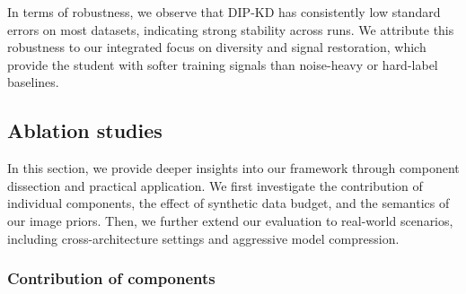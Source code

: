 \begin{foldable}
  In terms of robustness, we observe that DIP-KD has consistently low standard errors on most datasets, indicating strong stability across runs.
  We attribute this robustness to our integrated focus on diversity and signal restoration, which provide the student with softer training signals than noise-heavy or hard-label baselines.
\end{foldable}

\subsection{Ablation studies} \label{ssec:04-experiments-ablation}
\begin{foldable}
  In this section, we provide deeper insights into our framework through component dissection and practical application.
  We first investigate the contribution of individual components, the effect of synthetic data budget, and the semantics of our image priors.
  Then, we further extend our evaluation to real-world scenarios, including cross-architecture settings and aggressive model compression.
\end{foldable}

\subsubsection{Contribution of components} \label{sssec:04-experiments-ablation-components}

